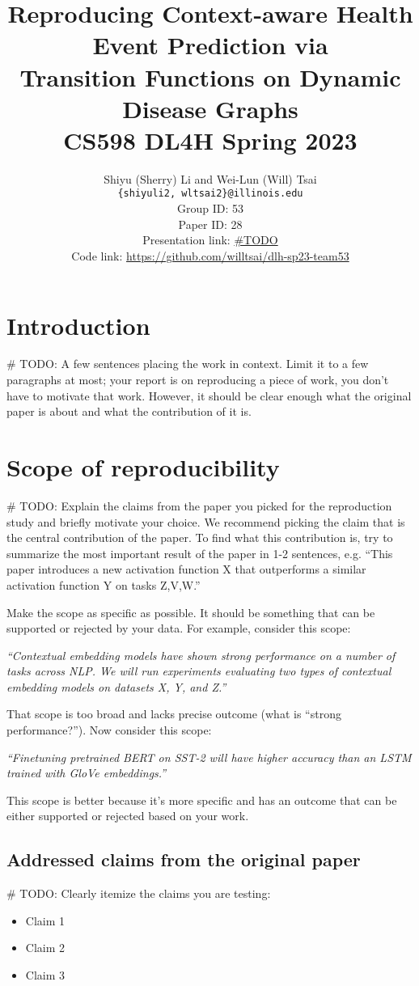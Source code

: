 \documentclass[11pt,a4paper,fleqn]{article}
\title{
  Reproducing Context-aware Health Event Prediction via \\
  Transition Functions on Dynamic Disease Graphs \cite{chet} \\
  CS598 DL4H Spring 2023
  }
\author{Shiyu (Sherry) Li and Wei-Lun (Will) Tsai \\
  \texttt{\{shiyuli2, wltsai2\}@illinois.edu}
  \\[2em]
  Group ID: 53\\
  Paper ID: 28\\
  Presentation link: \url{\#TODO} \\
  Code link: \url{https://github.com/willtsai/dlh-sp23-team53}}
\begin{document}
\maketitle


\section{Introduction}
\# TODO:
A  few  sentences  placing  the  work  in  context. Limit it to a few paragraphs at most; your report is on reproducing a piece of work, you don’t have to motivate that work. However, it should be clear enough what the original paper is about and what the contribution of it is.

\section{Scope of reproducibility}
\# TODO:
Explain the claims from the paper you picked for the reproduction study and briefly motivate your choice. We recommend picking the claim that is the central contribution of the paper. To find what this contribution is, try to summarize the most important result of the paper in 1-2 sentences, e.g. ``This paper introduces a new activation function X that outperforms a similar activation function Y on tasks Z,V,W.'' 

Make the scope as specific as possible. It should be something that can be supported or rejected by your data. For example, consider this scope: 

\textit{``Contextual embedding models have shown strong performance on a number of tasks across NLP. We will run experiments evaluating two types of contextual embedding models on datasets X, Y, and Z.''}


That scope is too broad and lacks precise outcome (what is ``strong performance?''). Now consider this scope:

\textit{``Finetuning pretrained BERT on SST-2 will have higher accuracy than an LSTM trained with GloVe embeddings.''}

This scope is better because it's more specific and has an outcome that can be either supported or rejected based on your work.

\subsection{Addressed claims from the original paper}
\# TODO:
Clearly itemize the claims you are testing:
\begin{itemize}
    \item Claim 1
    \item Claim 2
    \item Claim 3
\end{itemize}
\end{document}
